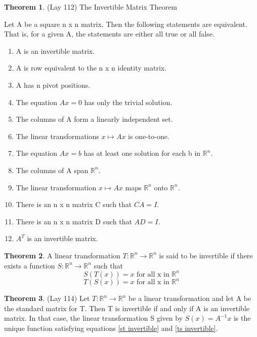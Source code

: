 \documentclass[12pt]{article}
\theoremstyle{definition}
\newtheorem{theorem}{Theorem}  %
\numberwithin{equation}{theorem}    %
\begin{document}
\begin{theorem}(Lay 112)
    The Invertible Matrix Theorem

    Let A be a square n x n matrix. Then the following statements are equivalent. That is, for a given A, the statements are either all true or all false.
    \begin{enumerate}
        \item A is an invertible matrix.
        \item A is row equivalent to the n x n identity matrix.
        \item A has n pivot positions.
        \item The equation $Ax=0$ has only the trivial solution.
        \item The columns of A form a linearly independent set.
        \item The linear transformations $x \mapsto Ax$ is one-to-one.
        \item The equation $Ax=b$ has at least one solution for each b in $\mathbb{R}^n$.
        \item The columns of A span $\mathbb{R}^n$.
        \item The linear transformation $x \mapsto Ax$ maps $\mathbb{R}^n$ onto $\mathbb{R}^n$.
        \item There is an n x n matrix C such that $CA=I$.
        \item There is an n x n matrix D such that $AD=I$.
        \item $A^T$ is an invertible matrix.
    \end{enumerate}
\end{theorem}

\begin{theorem}
    A linear transformation $T:\mathbb{R}^n \to \mathbb{R}^n$ is said to be invertible if there exists a function $S:\mathbb{R}^n \to \mathbb{R}^n$ such that
    \begin{equation} \label{st invertible}
        S(T(x))= x \text{ for all x in } \mathbb{R}^n
    \end{equation}
    \begin{equation} \label{ts invertible}
        T(S(x))= x \text{ for all x in } \mathbb{R}^n
    \end{equation}
\end{theorem}

\begin{theorem}(Lay 114)
    Let $T:\mathbb{R}^n \to \mathbb{R}^n$ be a linear transformation and let A be the standard matrix for T. Then T is invertible if and only if A is an invertible matrix. In that case, the linear transformation S given by $S(x)=A^{-1}x$ is the unique function satisfying equations \ref{st invertible} and \ref{ts invertible}.
\end{theorem}
\end{document}

